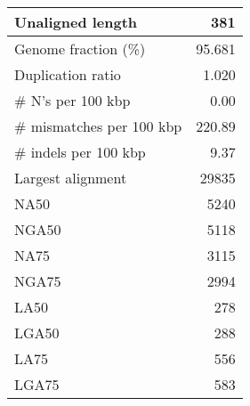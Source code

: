 \documentclass[12pt,a4paper]{article}
\begin{document}
\begin{table}[ht]
\begin{center}
\begin{tabular}{|l*{1}{|r}|}
Unaligned length & 381 \\ \hline
Genome fraction (\%) & 95.681 \\ \hline
Duplication ratio & 1.020 \\ \hline
\# N's per 100 kbp & 0.00 \\ \hline
\# mismatches per 100 kbp & 220.89 \\ \hline
\# indels per 100 kbp & 9.37 \\ \hline
Largest alignment & 29835 \\ \hline
NA50 & 5240 \\ \hline
NGA50 & 5118 \\ \hline
NA75 & 3115 \\ \hline
NGA75 & 2994 \\ \hline
LA50 & 278 \\ \hline
LGA50 & 288 \\ \hline
LA75 & 556 \\ \hline
LGA75 & 583 \\ \hline
\end{tabular}
\end{center}
\end{table}
\end{document}
